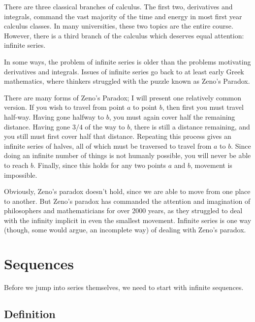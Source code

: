 \documentclass[fleqn,letterpaper]{report}
\begin{document}
There are three classical branches of calculus.
The first two, derivatives and integrals, command the vast
majority of the time and energy in most first year calculus
classes. In many universities, these two topics are the
entire course. However, there is a third branch of the
calculus which deserves equal attention: infinite
series.

In some ways, the problem of infinite series is older than the
problems motivating derivatives and integrals.  Issues of
infinite series go back to at least early Greek mathematics,
where thinkers struggled with the puzzle known as Zeno's
Paradox.

There are many forms of Zeno's Paradox; I will present one 
relatively common version. If you wish to travel from point
$a$ to point $b$, then first you must travel half-way. Having
gone halfway to $b$, you must again cover half the remaining
distance. Having gone $3/4$ of the way to $b$, there is still
a distance remaining, and you still must first cover half that
distance. Repeating this process gives an infinite series of
halves, all of which must be traversed to travel from $a$ to
$b$. Since doing an infinite number of things is not humanly
possible, you will never be able to reach $b$. Finally, since
this holds for any two points $a$ and $b$, movement is
impossible. 

Obviously, Zeno's paradox doesn't hold, since we are able to
move from one place to another. But Zeno's paradox has
commanded the attention and imagination of philosophers and
mathematicians for over 2000 years, as they struggled to deal
with the infinity implicit in even the smallest movement.
Infinite series is one way (though, some would argue, an
incomplete way) of dealing with Zeno's paradox.

\section{Sequences}
\label{sequences}

Before we jump into series themselves, we need to start with
infinite sequences.

\subsection{Definition}
\label{sequences-definition}
\end{document}
